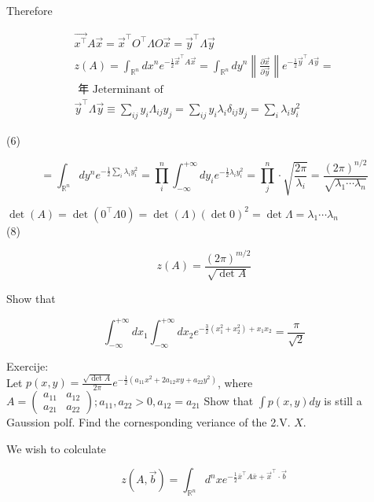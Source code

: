 \documentclass[10pt]{article}
\begin{document}
Therefore

$$
\begin{gathered}
\overrightarrow{x^{\top}} A \vec{x}=\vec{x}^{\top} O^{\top} \Lambda O \vec{x}=\vec{y}^{\top} \Lambda \vec{y} \\
z(A)=\int_{\mathbb{R}^{n}} d x^{n} e^{-\frac{1}{2} \vec{x}^{\top} A \vec{x}}=\int_{\mathbb{R}^{n}} d y^{n}\left\|\frac{\partial \vec{x}}{\partial \vec{y}}\right\| e^{-\frac{1}{2} \vec{y}^{\top} A \vec{y}}= \\
\text { 年 Jeterminant of } \\
\vec{y}^{\top} \Lambda \vec{y} \equiv \sum_{i j} y_{i} \Lambda_{i j} y_{j}=\sum_{i j} y_{i} \lambda_{i} \delta_{i j} y_{j}=\sum_{i} \lambda_{i} y_{i}^{2}
\end{gathered}
$$

(6)


\begin{equation*}
=\int_{\mathbb{R}^{n}} d y^{n} e^{-\frac{1}{2} \sum_{i} \lambda_{i} y_{i}^{2}}=\prod_{i}^{n} \int_{-\infty}^{+\infty} d y_{i} e^{-\frac{1}{2} \lambda_{i} y_{i}^{2}}=\prod_{j}^{n} \cdot \sqrt{\frac{2 \pi}{\lambda_{i}}}=\frac{(2 \pi)^{n / 2}}{\sqrt{\lambda_{1} \cdots \lambda_{n}}} \tag{1}
\end{equation*}


$\operatorname{det}(A)=\operatorname{det}\left(0^{\top} \Lambda 0\right)=\operatorname{det}(\Lambda)(\operatorname{det} 0)^{2}=\operatorname{det} \Lambda=\lambda_{1} \cdots \lambda_{n}$\\
(8)

$$
z(A)=\frac{(2 \pi)^{m / 2}}{\sqrt{\operatorname{det} A}}
$$

Show that

$$
\int_{-\infty}^{+\infty} d x_{1} \int_{-\infty}^{+\infty} d x_{2} e^{-\frac{3}{2}\left(x_{1}^{2}+x_{2}^{2}\right)+x_{1} x_{2}}=\frac{\pi}{\sqrt{2}}
$$

Exercije:\\
Let $p(x, y)=\frac{\sqrt{\operatorname{det} A}}{2 \pi} e^{-\frac{1}{2}\left(a_{11} x^{2}+2 a_{12} x y+a_{22} y^{2}\right)}$, where $A=\left(\begin{array}{ll}a_{11} & a_{12} \\ a_{21} & a_{22}\end{array}\right) ; a_{11}, a_{22}>0, a_{12}=a_{21}$ Show that $\int p(x, y) d y$ is still a Gaussion polf. Find the cornesponding veriance of the 2.V. $X$.

We wish to colculate


\begin{equation*}
z(A, \vec{b})=\int_{\mathbb{R}^{n}} d^{n} x e^{-\frac{1}{2} \bar{x}^{\top} A \bar{x}+\vec{x}^{\top} \cdot \vec{b}} \tag{9}
\end{equation*}
\end{document}
